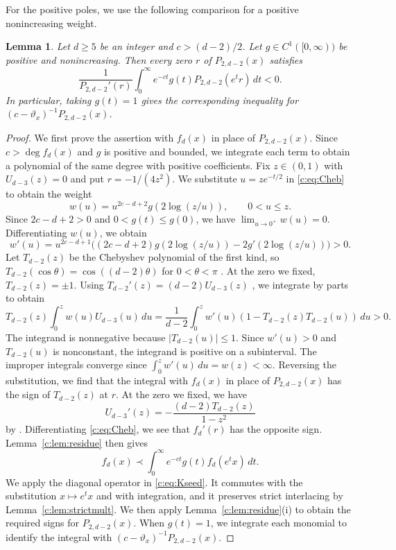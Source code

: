 \documentclass[10pt,a4paper]{article}
\numberwithin{equation}{section}
\newtheorem{lemma}[theorem]{Lemma}
\theoremstyle{remark}\newtheorem{remark}[theorem]{Remark}
\newcommand{\varthetax}{\vartheta_x}
\begin{document}
For the positive poles, we use the following comparison for a positive
nonincreasing weight.
\begin{lemma}\label{c:lem:right}
Let $d\ge5$ be an integer and $c>(d-2)/2$. Let
$g\in C^1([0,\infty))$ be positive and
nonincreasing. Then every zero $r$ of $P_{2,d-2}(x)$ satisfies
\[
 \frac{1}{P_{2,d-2}'(r)}\int_0^\infty e^{-ct}g(t)P_{2,d-2}(e^t r)\,dt<0.
\]
In particular, taking $g(t)=1$ gives the corresponding inequality for
$(c-\varthetax)^{-1}P_{2,d-2}(x)$.
\end{lemma}
\begin{proof}
We first prove the assertion with $f_d(x)$ in place of $P_{2,d-2}(x)$.
Since $c>\deg f_d(x)$ and $g$ is positive and bounded, we integrate each
term to obtain a polynomial of the same degree with positive coefficients.
Fix $z\in(0,1)$ with $U_{d-3}(z)=0$ and put $r=-1/(4z^2)$.
We substitute $u=ze^{-t/2}$ in \eqref{c:eq:Cheb} to obtain the weight
\[
 w(u)=u^{2c-d+2}g(2\log(z/u)),\qquad 0<u\le z.
\]
Since $2c-d+2>0$ and $0<g(t)\le g(0)$, we have
$\lim_{u\to0^+}w(u)=0$.
Differentiating $w(u)$, we obtain
\[
 w'(u)=u^{2c-d+1}\bigl((2c-d+2)g(2\log(z/u))-2g'(2\log(z/u))\bigr)>0.
\]
Let $T_{d-2}(z)$ be the Chebyshev polynomial of the first kind, so
$T_{d-2}(\cos\theta)=\cos((d-2)\theta)$ for $0<\theta<\pi$
\cite[Eq.~(18.5.1)]{DLMF}. At the zero we fixed, $T_{d-2}(z)=\pm1$.
Using $T_{d-2}'(z)=(d-2)U_{d-3}(z)$ \cite[Eq.~(18.9.21)]{DLMF},
we integrate by parts to obtain
\[
 T_{d-2}(z)\int_0^z w(u)U_{d-3}(u)\,du
 =\frac1{d-2}\int_0^z w'(u)
       (1-T_{d-2}(z)T_{d-2}(u))\,du>0.
\]
The integrand is nonnegative because $|T_{d-2}(u)|\le1$.
Since $w'(u)>0$ and $T_{d-2}(u)$ is nonconstant, the integrand is
positive on a subinterval. The improper integrals converge since
$\int_0^z w'(u)\,du=w(z)<\infty$.
Reversing the substitution, we find that the
integral with $f_d(x)$ in place of $P_{2,d-2}(x)$ has the sign of $T_{d-2}(z)$
at $r$. At the zero we fixed, we have
\[
 U_{d-3}'(z)=-\frac{(d-2)T_{d-2}(z)}{1-z^2}
\]
by \cite[Eq.~(18.9.22)]{DLMF}. Differentiating \eqref{c:eq:Cheb},
we see that $f_d'(r)$ has the opposite sign.
Lemma~\ref{c:lem:residue} then gives
\[
 f_d(x)\prec\int_0^\infty e^{-ct}g(t)f_d(e^t x)\,dt.
\]
We apply the diagonal operator in \eqref{c:eq:Kseed}. It commutes with
the substitution $x\mapsto e^t x$ and with integration, and it preserves
strict interlacing by Lemma~\ref{c:lem:strictmult}.
We then apply Lemma~\ref{c:lem:residue}(i) to obtain
the required signs for $P_{2,d-2}(x)$. When $g(t)=1$, we integrate each monomial to identify
the integral with $(c-\varthetax)^{-1}P_{2,d-2}(x)$.
\end{proof}
\end{document}
